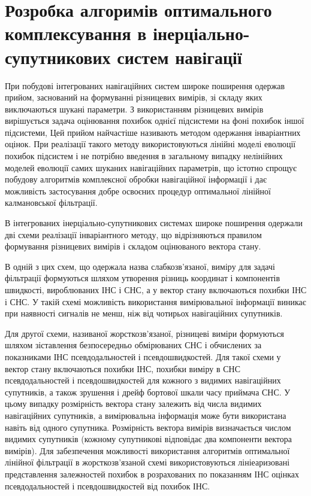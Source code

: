 \section{Розробка алгоримів оптимального комплексування в інерціально-супутникових
систем навігації}

При побудові інтегрованих  навігаційних систем широке поширення одержав прийом, 
заснований на формуванні різницевих вимірів, зі складу яких виключаються шукані 
параметри. З використанням різницевих вимірів  вирішується задача оцінювання 
похибок однієї підсистеми на фоні похибок іншої підсистеми, Цей прийом  найчастіше 
називають методом одержання інваріантних оцінок. При реалізації такого методу 
використовуються лінійні моделі еволюції похибок підсистем  і не потрібно введення 
в загальному випадку нелінійних моделей еволюції самих шуканих навігаційних параметрів, 
що істотно спрощує побудову алгоритмів комплексної обробки навігаційної інформації і 
дає можливість застосування добре освоєних процедур оптимальної  лінійної калмановської 
фільтрації. 

В інтегрованих інерціально-супутникових системах широке поширення одержали дві 
схеми реалізації інваріантного методу, що відрізняються правилом формування різницевих 
вимірів і складом оцінюваного вектора стану.

В одній з цих схем, що одержала назва слабкозв'язаної, виміру для задачі фільтрації 
формуються шляхом утворення різниць координат і компонентів швидкості, вироблюваних ІНС 
і  СНС, а у вектор стану включаються похибки ІНС і  СНС. У такій схемі можливість 
використання  вимірювальної інформації виникає при наявності сигналів не менш, ніж 
від чотирьох навігаційних супутників.

Для другої схеми, називаної жорсткозв'язаної, різницеві виміри формуються шляхом 
зіставлення безпосередньо  обмірюваних СНС і обчислених за показниками ІНС псевдодальностей і 
псевдошвидкостей. Для такої схеми у вектор стану включаються похибки ІНС, похибки виміру в 
СНС псевдодальностей і псевдошвидкостей для кожного з видимих навігаційних супутників, а 
також зрушення і дрейф бортової шкали часу приймача СНС. У цьому випадку розмірність вектора 
стану залежить від числа видимих навігаційних супутників, а вимірювальна інформація  може 
бути використана навіть від одного супутника. Розмірність вектора вимірів визначається 
числом видимих супутників (кожному супутникові відповідає два компоненти вектора вимірів). 
Для забезпечення можливості використання алгоритмів оптимальної  лінійної фільтрації в 
жорсткозв’язаной схемі використовуються лініеаризовані представлення залежностей  похибок 
в розрахованих по показанням ІНС оцінках псевдодальностей і псевдошвидкостей від похибок ІНС.

